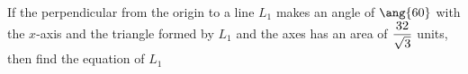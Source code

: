



\question[4] If the perpendicular from the origin to a line $L_1$ makes an angle of $\ang{\vbfour}$ 
with the $x$-axis and the triangle formed by $L_1$ and the axes has an area of $\dfrac{32}{\sqrt{3}}$ units,
then find the equation of $L_1$


\watchout


